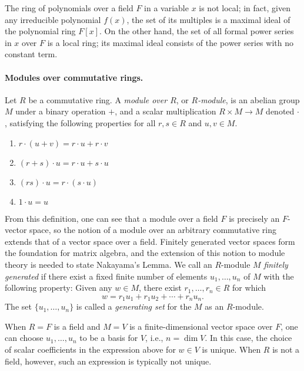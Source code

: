 \documentclass{article}
\begin{document}
The ring of polynomials over a field $F$ in a variable $x$ is not local; in
fact, given any irreducible polynomial $f(x)$, the set of its multiples is a
maximal ideal of the polynomial ring $F[x]$. On the other hand, the set of all
formal power series  in $x$ over $F$ is a local ring; its maximal ideal
consists of the power series with no constant term. 


\paragraph{Modules over commutative rings.}
Let  $R$ be a commutative ring. 
A \emph{module over $R$}, or \emph{$R$-module}, is an abelian group $M$ under a
binary operation $+$, and a {scalar multiplication} $R \times M \to M$ denoted
$\cdot$, satisfying the following properties for all $r, s \in R$
and $u, v \in M$.

\begin{enumerate}[leftmargin=5cm,topsep=0cm,itemsep=0cm]
  \item  $r \cdot (u + v)  = r \cdot u + r \cdot v$
  \item $(r+s) \cdot u = r \cdot u + s \cdot u$
  \item $(rs) \cdot u = r \cdot (s \cdot u)$
  \item $1 \cdot u = u$ 
\end{enumerate}

From this definition, one can see that a module over a field $F$ is precisely
an $F$-vector space, so the notion of a module over an arbitrary commutative
ring extends that of a vector space over a field. Finitely generated vector
spaces form the foundation for matrix algebra, and the extension of this notion
to module theory is needed to state Nakayama's Lemma. We call an $R$-module
$M$ \emph{finitely generated} if there exist a fixed finite number of elements
$u_1, \ldots, u_n$ of $M$ with the following property:  Given any  $w \in M$,
there exist $r_1, \ldots, r_n \in R$ for which  
\[w = r_1 u_1 + r_1 u_2 + \cdots + r_n u_n\text{.}\]
The set $\{u_1, \ldots, u_n\}$ is called a \emph{generating set} for the $M$ as
an $R$-module. 

When $R = F$ is a field and $M = V$ is a finite-dimensional vector space over
$F$, one can choose $u_1, \ldots, u_n$ to be a basis for $V$, i.e.,
$n = \dim V$. In this case, the choice of scalar coefficients in the expression
above for $w \in V$ is unique. When $R$ is not a field, however, such an
expression is typically not unique. 
\end{document}
